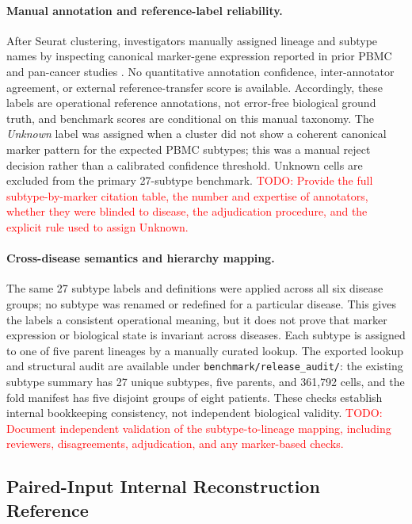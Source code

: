 \documentclass{article} %
\newcommand{\todo}[1]{\textcolor{red}{TODO: #1}}
\begin{document}
\paragraph{Manual annotation and reference-label reliability.}
After Seurat clustering, investigators manually assigned lineage and subtype
names by inspecting canonical marker-gene expression reported in prior PBMC and
pan-cancer studies \citep{zhang2024pan,yang2024pan}. No quantitative annotation
confidence, inter-annotator agreement, or external reference-transfer score is
available. Accordingly, these labels are operational reference annotations, not
error-free biological ground truth, and benchmark scores are conditional on this
manual taxonomy. The \emph{Unknown} label was assigned when a cluster did not show
a coherent canonical marker pattern for the expected PBMC subtypes; this was a
manual reject decision rather than a calibrated confidence threshold. Unknown
cells are excluded from the primary 27-subtype benchmark. \todo{Provide the full
subtype-by-marker citation table, the number and expertise of annotators, whether
they were blinded to disease, the adjudication procedure, and the explicit rule
used to assign Unknown.}

\paragraph{Cross-disease semantics and hierarchy mapping.}
The same 27 subtype labels and definitions were applied across all six disease
groups; no subtype was renamed or redefined for a particular disease. This gives
the labels a consistent operational meaning, but it does not prove that marker
expression or biological state is invariant across diseases. Each subtype is
assigned to one of five parent lineages by a manually curated lookup.
The exported lookup and structural audit are available under
\texttt{benchmark/release\_audit/}: the existing subtype summary has 27 unique
subtypes, five parents, and 361{,}792 cells, and the fold manifest has five
disjoint groups of eight patients. These checks establish internal bookkeeping
consistency, not independent biological validity.
\todo{Document independent validation of the subtype-to-lineage mapping, including
reviewers, disagreements, adjudication, and any marker-based checks.}

\subsection{Paired-Input Internal Reconstruction Reference}
\label{sec:appendix:paired_rna_oracle}
\end{document}
